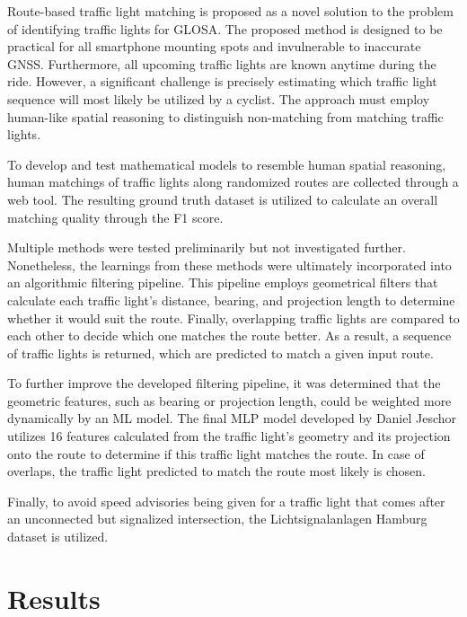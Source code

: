 \begin{Summary}
Route-based traffic light matching is proposed as a novel solution to the problem of identifying traffic lights for GLOSA. The proposed method is designed to be practical for all smartphone mounting spots and invulnerable to inaccurate GNSS. Furthermore, all upcoming traffic lights are known anytime during the ride. However, a significant challenge is precisely estimating which traffic light sequence will most likely be utilized by a cyclist. The approach must employ human-like spatial reasoning to distinguish non-matching from matching traffic lights.

To develop and test mathematical models to resemble human spatial reasoning, human matchings of traffic lights along randomized routes are collected through a web tool. The resulting ground truth dataset is utilized to calculate an overall matching quality through the F1 score.

Multiple methods were tested preliminarily but not investigated further. Nonetheless, the learnings from these methods were ultimately incorporated into an algorithmic filtering pipeline. This pipeline employs geometrical filters that calculate each traffic light's distance, bearing, and projection length to determine whether it would suit the route. Finally, overlapping traffic lights are compared to each other to decide which one matches the route better. As a result, a sequence of traffic lights is returned, which are predicted to match a given input route.

To further improve the developed filtering pipeline, it was determined that the geometric features, such as bearing or projection length, could be weighted more dynamically by an ML model. The final MLP model developed by Daniel Jeschor \cite{jeschor_2022} utilizes 16 features calculated from the traffic light's geometry and its projection onto the route to determine if this traffic light matches the route. In case of overlaps, the traffic light predicted to match the route most likely is chosen.

Finally, to avoid speed advisories being given for a traffic light that comes after an unconnected but signalized intersection, the Lichtsignalanlagen Hamburg dataset is utilized. 
\end{Summary}

\section{Results}

